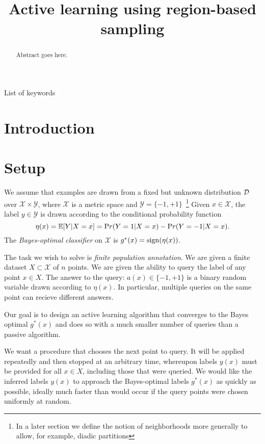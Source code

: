 \documentclass[anon,12pt]{colt2022} %
\title[Active learning using region-based sampling]{Active learning using region-based sampling}
\def\pr{{\textrm Pr}}
\def\E{{\mathbb E}}
\def\X{{\mathcal X}}
\def\Y{{\mathcal Y}}
\def\sign{{\rm sign}}
\newcommand{\D}{{\cal D}}
\begin{document}
\maketitle

\begin{abstract}%
Abstract goes here.
\end{abstract}

\begin{keywords}%
List of keywords
\end{keywords}

\section{Introduction}



\section{Setup}

We assume that examples are drawn from a fixed but unknown
distribution $\D$ over $\X \times \Y$, where $\X$ is a metric space and
$\Y = \{-1,+1\}$~\footnote{In a later section we define the notion of
  neighborhoods more generally to allow, for example, diadic
  partitions}
Given $x \in \X$, the label $y \in \Y$ is drawn
according to the conditional probability function
$$ \eta(x) = \E[Y | X=x] = \pr(Y=1|X=x) - \pr(Y=-1|X=x).$$
The \emph{Bayes-optimal classifier} on $\X$ is $g^*(x) = \sign(\eta(x))$.

The task we wish to solve is \emph{finite population annotation}. We
are given a finite dataset $X \subset \X$ of $n$ points.
We are given the ability to query the label of any point $x \in X$. The
answer to the query: $a(x) \in \{-1,+1\}$ is a binary random variable
drawn according to $\eta(x)$. In particular, multiple queries on the
same point can recieve different answers.

Our goal is to design an active learning algorithm that converges to the Bayes
optimal $g^*(x)$ and does so with a much smaller number of queries
than a passive algorithm.  





We want a procedure that chooses the next point to query. It will be applied repeatedly and then stopped at an arbitrary time, whereupon labels $y(x)$ must be provided for all $x \in X$, including those that were queried. We would like the inferred labels $y(x)$ to approach the Bayes-optimal labels $g^*(x)$ as quickly as possible, ideally much faster than would occur if the query points were chosen uniformly at random.
\end{document}
